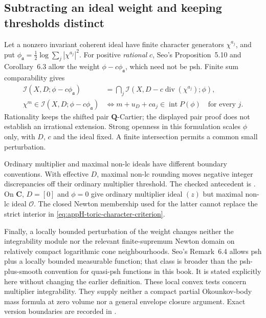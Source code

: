 \subsection{Subtracting an ideal weight and keeping thresholds distinct}
\label{sec:appH-toric-negative-ideal-weight}

Let a nonzero invariant coherent ideal have finite character generators
$\chi^{a_j}$, and put
$\phi_{\mathfrak a}=\tfrac12\log\sum_j|\chi^{a_j}|^2$.
For positive \emph{rational} $c$, Seo's Proposition~5.10 and
Corollary~6.3 allow the weight $\phi-c\phi_{\mathfrak a}$, which
need not be psh. Finite sum comparability gives
\begin{equation*}
\begin{aligned}
 \mathcal I(X,D;\phi-c\phi_{\mathfrak a})
   &=\bigcap_j\mathcal I(X,D-c\operatorname{div}(\chi^{a_j});\phi),\\
 \chi^m\in\mathcal I(X,D;\phi-c\phi_{\mathfrak a})
   &\Longleftrightarrow
       m+u_D+ca_j\in\operatorname{int}P(\phi)\quad\text{for every }j.
\end{aligned}
\tag{H.71}\label{eq:appH-toric-negative-ideal-criterion}
\end{equation*}
Rationality keeps the shifted pair $\mathbf Q$-Cartier; the displayed
pair proof does not establish an irrational extension. Strong openness
in this formulation scales $\phi$ only, with $D$, $c$ and the ideal
fixed. A finite intersection permits a common small perturbation.

Ordinary multiplier and maximal non-lc ideals have different boundary
conventions. With effective $D$, maximal non-lc rounding moves negative
integer discrepancies off their ordinary multiplier threshold. The
checked antecedent is
\cite[Definition~7.1 and Lemmas~7.2, 7.5, actual pp.~10--12]{FujinoSchwedeTakagiAuthorRevision}.
On $\mathbf C$, $D=[0]$ and $\phi=0$ give ordinary multiplier ideal
$(z)$ but maximal non-lc ideal $\mathcal O$. The closed Newton
membership used for the latter cannot replace the strict interior
in \eqref{eq:appH-toric-character-criterion}.

Finally, a locally bounded perturbation of the weight changes neither
the integrability module nor the relevant finite-supremum Newton domain
on relatively compact logarithmic cone neighbourhoods. Seo's
Remark~6.4 allows psh plus a locally bounded measurable function;
that class is broader than the psh-plus-smooth convention for
quasi-psh functions in this book. It is stated explicitly here without
changing the earlier definition. These local convex tests concern
multiplier integrability. They supply neither a compact partial
Okounkov-body mass formula at zero volume nor a general envelope
closure argument. Exact version boundaries are recorded in
.

